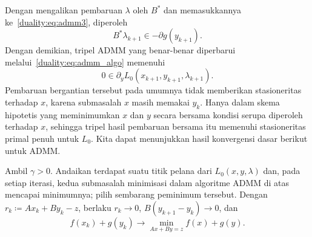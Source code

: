 Dengan mengalikan pembaruan $\lambda$ oleh $B^*$ dan memasukkannya ke~\eqref{duality:eq:admm3}, diperoleh
\begin{equation}
    B^*\lambda_{k+1} \in -\partial g(y_{k+1}).
\end{equation}
Dengan demikian, tripel ADMM yang benar-benar diperbarui
melalui~\eqref{duality:eq:admm_algo} memenuhi
\[
    0\in\partial_y L_0(x_{k+1},y_{k+1},\lambda_{k+1}).
\]
Pembaruan bergantian tersebut pada umumnya tidak memberikan stasioneritas
terhadap $x$, karena submasalah $x$ masih memakai $y_k$. Hanya dalam skema
hipotetis yang meminimumkan $x$ dan $y$ secara bersama kondisi serupa diperoleh
terhadap $x$, sehingga tripel hasil pembaruan bersama itu memenuhi
stasioneritas primal penuh untuk $L_0$.
Kita dapat menunjukkan hasil konvergensi dasar berikut untuk ADMM.
\begin{theorem}
    Ambil $\gamma>0$. Andaikan terdapat suatu titik pelana dari $L_0(x,y,\lambda)$ dan, pada setiap iterasi, kedua submasalah minimisasi dalam algoritme ADMM di atas mencapai minimumnya; pilih sembarang peminimum tersebut. Dengan $r_k\coloneq Ax_k+By_k-z$, berlaku $r_k\rightarrow0$, $B(y_{k+1}-y_k)\rightarrow0$, dan
    \begin{equation}
        f(x_k)+g(y_k) \rightarrow \min_{Ax + By = z} f(x) + g(y).
    \end{equation}
\end{theorem}

